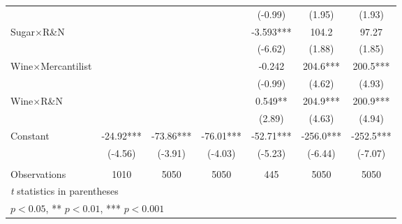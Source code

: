 {\begin{tabular}{l*{6}{c}}
                    &                     &                     &                     &     (-0.99)         &      (1.95)         &      (1.93)         \\
[1em]
Sugar$\times$R\&N &                     &                     &                     &      -3.593***&       104.2         &       97.27         \\
                    &                     &                     &                     &     (-6.62)         &      (1.88)         &      (1.85)         \\
[1em]
Wine$\times$Mercantilist&                     &                     &                     &      -0.242         &       204.6***&       200.5***\\
                    &                     &                     &                     &     (-0.99)         &      (4.62)         &      (4.93)         \\
[1em]
Wine$\times$R\&N &                     &                     &                     &       0.549** &       204.9***&       200.9***\\
                    &                     &                     &                     &      (2.89)         &      (4.63)         &      (4.94)         \\
[1em]
Constant            &      -24.92***&      -73.86***&      -76.01***&      -52.71***&      -256.0***&      -252.5***\\
                    &     (-4.56)         &     (-3.91)         &     (-4.03)         &     (-5.23)         &     (-6.44)         &     (-7.07)         \\
\hline\\
Observations        &        1010         &        5050         &        5050         &         445         &        5050         &        5050         \\
\hline\hline
\multicolumn{7}{l}{\footnotesize \textit{t} statistics in parentheses}\\
\multicolumn{7}{l}{\footnotesize * \(p<0.05\), ** \(p<0.01\), *** \(p<0.001\)}\\
\end{tabular}
}
